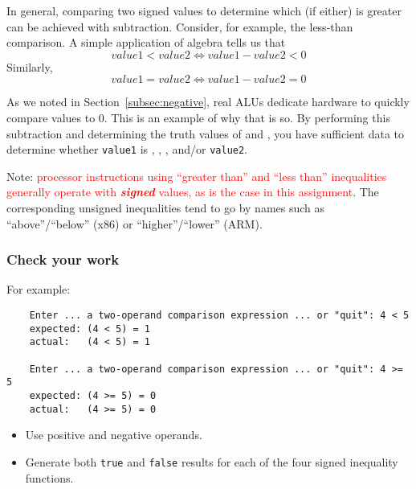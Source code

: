 In general, comparing two signed values to determine which (if either) is greater can be achieved with subtraction.
Consider, for example, the less-than comparison.
A simple application of algebra tells us that \[value1 < value2 \Leftrightarrow value1 - value2 < 0\]
Similarly, \[value1 = value2 \Leftrightarrow value1 - value2 = 0\]

As we noted in Section~\ref{subsec:negative}, real ALUs dedicate hardware to quickly compare values to 0.
This is an example of why that is so.
By performing this subtraction and determining the truth values of  and , you have sufficient data to determine whether \lstinline{value1} is , , , and/or  \lstinline{value2}.
\begin{description}
\end{description}

Note: \textcolor{red}{processor instructions using ``greater than'' and ``less than'' inequalities generally operate with \textbf{\textit{signed}} values, as is the case in this assignment}.
The corresponding unsigned inequalities tend to go by names such as ``above''/``below'' (x86) or ``higher''/``lower'' (ARM).

\subsubsection*{Check your work}

\begin{description}
\end{description}
For example:
\begin{verbatim}
    Enter ... a two-operand comparison expression ... or "quit": 4 < 5
    expected: (4 < 5) = 1
    actual:   (4 < 5) = 1

    Enter ... a two-operand comparison expression ... or "quit": 4 >= 5
    expected: (4 >= 5) = 0
    actual:   (4 >= 5) = 0
\end{verbatim}

\begin{description}
    \begin{itemize}
        \item Use positive and negative operands.
        \item Generate both \lstinline{true} and \lstinline{false} results for each of the four signed inequality functions.
    \end{itemize}
\end{description}
